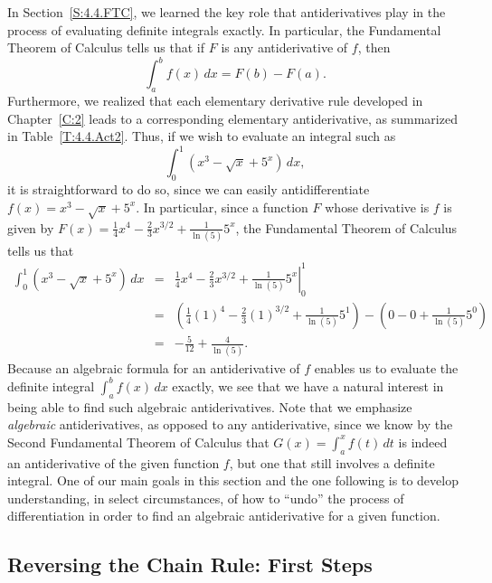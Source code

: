 In Section~\ref{S:4.4.FTC}, we learned the key role that antiderivatives play in the process of evaluating definite integrals exactly.  In particular, the Fundamental Theorem of Calculus tells us that if $F$ is any antiderivative of $f$, then
$$\int_a^b f(x) \, dx = F(b) - F(a).$$
Furthermore, we realized that each elementary derivative rule developed in Chapter~\ref{C:2} leads to a corresponding elementary antiderivative, as summarized in Table~\ref{T:4.4.Act2}.  Thus, if we wish to evaluate an integral such as 
$$\int_0^1 \left(x^3 - \sqrt{x} + 5^x \right) \,dx,$$
it is straightforward to do so, since we can easily antidifferentiate $f(x) = x^3 - \sqrt{x} + 5^x.$ In particular, since a function $F$ whose derivative is $f$ is given by $F(x) = \frac{1}{4}x^4 - \frac{2}{3}x^{3/2} + \frac{1}{\ln(5)}5^x$, the Fundamental Theorem of Calculus tells us that
\begin{eqnarray*}
\int_0^1 \left(x^3 - \sqrt{x} + 5^x\right) \,dx & = & \left. \frac{1}{4}x^4 - \frac{2}{3}x^{3/2} + \frac{1}{\ln(5)}5^x\right|_0^1 \\
								& = & \left( \frac{1}{4}(1)^4 - \frac{2}{3}(1)^{3/2} + \frac{1}{\ln(5)}5^1 \right) - \left( 0 - 0 + \frac{1}{\ln(5)}5^0 \right) \\
								& = & -\frac{5}{12} + \frac{4}{\ln(5)}.
\end{eqnarray*}
Because an algebraic formula for an antiderivative of $f$ enables us to evaluate the definite integral $\int_a^b f(x) \, dx$ exactly, we see that we have a natural interest in being able to find such algebraic antiderivatives.  Note that we emphasize \emph{algebraic} antiderivatives, as opposed to any antiderivative, since we know by the Second Fundamental Theorem of Calculus that $G(x) = \int_a^x f(t) \, dt$ is indeed an antiderivative of the given function $f$, but one that still involves a definite integral.  One of our main goals in this section and the one following is to develop understanding, in select circumstances, of how to ``undo'' the process of differentiation in order to find an algebraic antiderivative for a given function.



\subsection*{Reversing the Chain Rule: First Steps} 

